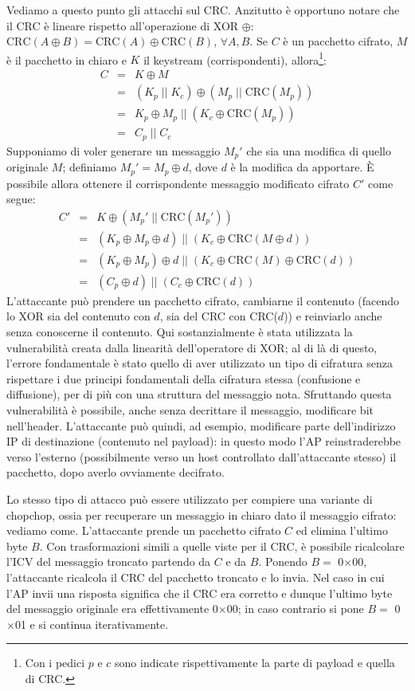 Vediamo a questo punto gli attacchi sul CRC. Anzitutto è opportuno notare che il CRC è lineare rispetto all'operazione di XOR $\oplus$: $\text{CRC}(A \oplus B) = \text{CRC}(A) \oplus \text{CRC}(B)$, $\forall A, B$. Se $C$ è un pacchetto cifrato, $M$ è il pacchetto in chiaro e $K$ il keystream (corrispondenti), allora\footnote{Con i pedici $p$ e $c$ sono indicate rispettivamente la parte di payload e quella di CRC.}:
\begin{eqnarray*}
C &=& K \oplus M \\
&=& (K_p \; || \; K_c) \oplus (M_p \; || \; \text{CRC}(M_p))\\
&=& K_p \oplus M_p \; || \; (K_c \oplus \text{CRC}(M_p))\\
&=& C_p \; || \; C_c
\end{eqnarray*}
Supponiamo di voler generare un messaggio $M_p'$ che sia una modifica di quello originale $M$; definiamo $M_p' = M_p \oplus d$, dove $d$ è la modifica da apportare. È possibile allora ottenere il corrispondente messaggio modificato cifrato $C'$ come segue:
\begin{eqnarray*}
C' &=& K \oplus (M_p' \; || \; \text{CRC}(M_p'))\\
&=& (K_p \oplus M_p \oplus d) \; || \; (K_c \oplus \text{CRC}(M \oplus d))\\
&=& (K_p \oplus M_p) \oplus d \; || \; (K_c \oplus \text{CRC}(M) \oplus \text{CRC}(d))\\
&=& (C_p \oplus d) \; || \; (C_c \oplus \text{CRC}(d))
\end{eqnarray*}
L'attaccante può prendere un pacchetto cifrato, cambiarne il contenuto (facendo lo XOR sia del contenuto con $d$, sia del CRC con CRC($d$)) e reinviarlo anche senza conoscerne il contenuto. Qui sostanzialmente è stata utilizzata la vulnerabilità creata dalla linearità dell'operatore di XOR; al di là di questo, l'errore fondamentale è stato quello di aver utilizzato un tipo di cifratura senza rispettare i due principi fondamentali della cifratura stessa (confusione e diffusione), per di più con una struttura del messaggio nota. Sfruttando questa vulnerabilità è possibile, anche senza decrittare il messaggio, modificare bit nell'header. L'attaccante può quindi, ad esempio, modificare parte dell'indirizzo IP di destinazione (contenuto nel payload): in questo modo l'AP reinstraderebbe verso l'esterno (possibilmente verso un host controllato dall'attaccante stesso) il pacchetto, dopo averlo ovviamente decifrato.

Lo stesso tipo di attacco può essere utilizzato per compiere una variante di chopchop, ossia per recuperare un messaggio in chiaro dato il messaggio cifrato: vediamo come. L'attaccante prende un pacchetto cifrato $C$ ed elimina l'ultimo byte $B$. Con trasformazioni simili a quelle viste per il CRC, è possibile ricalcolare l'ICV del messaggio troncato partendo da $C$ e da $B$. Ponendo $B=$ 0$\times$00, l'attaccante ricalcola il CRC del pacchetto troncato e lo invia. Nel caso in cui l'AP invii una risposta significa che il CRC era corretto e dunque l'ultimo byte del messaggio originale era effettivamente 0$\times$00; in caso contrario si pone $B=$ 0$\times$01 e si continua iterativamente.\\

